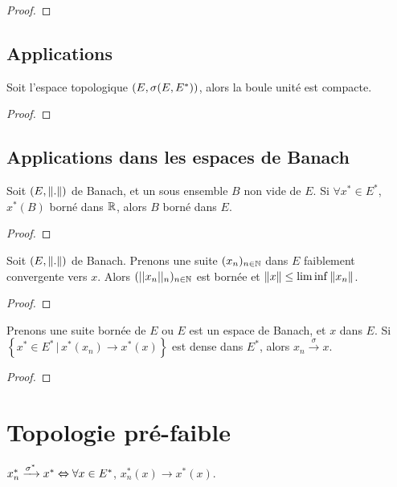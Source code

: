 \begin{proof}

\end{proof}

\subsection{Applications}

\begin{theorem}
	Soit l'espace topologique $(E, \sigma(E, E^{*}))$, alors la boule unité
	est compacte.
\end{theorem}

\begin{proof}

\end{proof}

\subsection{Applications dans les espaces de Banach}

\begin{proposition}
	Soit $(E, \norm{.})$ de Banach, et un sous ensemble $B$ non
	vide de $E$.
	Si $\forall x^{*} \in E^{*}$, $x^{*}(B)$ borné dans $\mathbb{R}$, alors $B$ borné
	dans $E$.
\end{proposition}

\begin{proof}

\end{proof}

\begin{corollary}
	Soit $(E, \norm{.})$ de Banach.
	Prenons une suite $(x_{n})_{n \in \mathbb{N}}$ dans $E$ faiblement
	convergente vers $x$.
	Alors $(||x_{n}||_{n})_{n \in \mathbb{N}}$ est bornée et $\norm{x} \leq
	\lim\inf \norm{x_{n}}$.
\end{corollary}

\begin{proof}

\end{proof}

\begin{proposition}
	Prenons une suite bornée de $E$ ou $E$ est un espace de Banach, et $x$ dans
	$E$.
	Si $\left\{ x^{*} \in E^{*} \, | \, x^{*}(x_{n}) \rightarrow x^{*}(x)
\right\}$ est dense dans $E^{*}$, alors $x_{n} \xrightarrow{\sigma} x$.
\end{proposition}

\begin{proof}

\end{proof}

\section{Topologie pré-faible}


\begin{proposition}
	$x^{*}_{n} \xrightarrow{\sigma^{*}} x^{*} \Leftrightarrow \forall x \in E^{*}$,
	$x^{*}_{n}(x) \rightarrow x^{*}(x)$.
\end{proposition}
